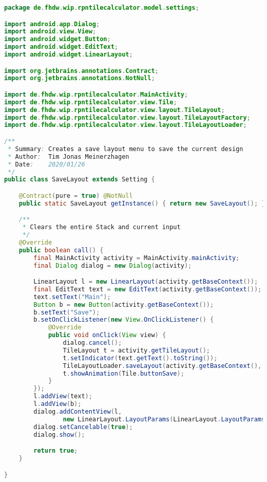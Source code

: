 \begin{lstlisting}[caption=SaveLayout (Meinerzhagen),label=list:SaveLayout,language=Java]
package de.fhdw.wip.rpntilecalculator.model.settings;

import android.app.Dialog;
import android.view.View;
import android.widget.Button;
import android.widget.EditText;
import android.widget.LinearLayout;

import org.jetbrains.annotations.Contract;
import org.jetbrains.annotations.NotNull;

import de.fhdw.wip.rpntilecalculator.MainActivity;
import de.fhdw.wip.rpntilecalculator.view.Tile;
import de.fhdw.wip.rpntilecalculator.view.layout.TileLayout;
import de.fhdw.wip.rpntilecalculator.view.layout.TileLayoutFactory;
import de.fhdw.wip.rpntilecalculator.view.layout.TileLayoutLoader;

/**
 * Summary: Creates a save layout menu to save the current design
 * Author:  Tim Jonas Meinerzhagen
 * Date:    2020/01/26
 */
public class SaveLayout extends Setting {

    @Contract(pure = true) @NotNull
    public static SaveLayout getInstance() { return new SaveLayout(); }

    /**
     * Clears the entire Stack and current input
     */
    @Override
    public boolean call() {
        final MainActivity activity = MainActivity.mainActivity;
        final Dialog dialog = new Dialog(activity);

        LinearLayout l = new LinearLayout(activity.getBaseContext());
        final EditText text = new EditText(activity.getBaseContext());
        text.setText("Main");
        Button b = new Button(activity.getBaseContext());
        b.setText("Save");
        b.setOnClickListener(new View.OnClickListener() {
            @Override
            public void onClick(View view) {
                dialog.cancel();
                TileLayout t = activity.getTileLayout();
                t.setIndicator(text.getText().toString());
                TileLayoutLoader.saveLayout(activity.getBaseContext(), t);
                t.showAnimation(Tile.buttonSave);
            }
        });
        l.addView(text);
        l.addView(b);
        dialog.addContentView(l,
                new LinearLayout.LayoutParams(LinearLayout.LayoutParams.WRAP_CONTENT, LinearLayout.LayoutParams.WRAP_CONTENT));
        dialog.setCancelable(true);
        dialog.show();

        return true;
    }

}
\end{lstlisting}    

